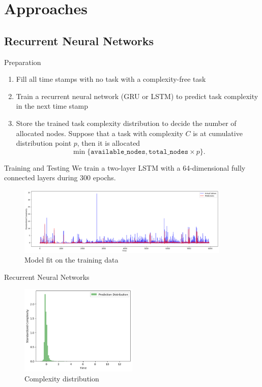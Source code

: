 \section{Approaches}
\subsection{Recurrent Neural Networks}

\begin{frame}{Preparation}
    \begin{enumerate}
        \item Fill all time stamps with no task with a complexity-free task
        \item Train a recurrent neural network (GRU or LSTM) to predict task complexity in the next time stamp
        \item Store the trained task complexity distribution to decide the number of allocated nodes. Suppose that a task with complexity $C$ is at cumulative distribution point $p$, then it is allocated
              $$\min\{\texttt{available\_nodes}, \texttt{total\_nodes}\times p\}.$$
    \end{enumerate}
\end{frame}

\begin{frame}{Training and Testing}
    We train a two-layer LSTM with a 64-dimensional fully connected layers during 300 epochs.
    \begin{figure}
        \includegraphics[width=0.9\textwidth]{img/train_accuracy.png}
        \caption{Model fit on the training data}
    \end{figure}
\end{frame}

\begin{frame}{Recurrent Neural Networks}
    \begin{figure}
        \includegraphics[width=0.5\textwidth]{img/complexity_ditribution.png}
        \caption{Complexity distribution}
    \end{figure}
\end{frame}

